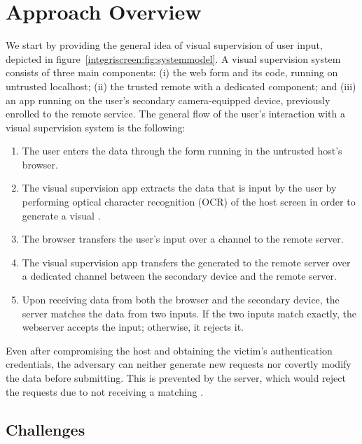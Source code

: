 \section{Approach Overview}
\label{integriscreen:sec:systemDesign}


We start by providing the general idea of visual supervision of user input, depicted in figure~\ref{integriscreen:fig:systemmodel}.
A visual supervision system consists of three main components: (i) the web form and its code, running on untrusted localhost; (ii) the trusted remote \server with a dedicated component; and (iii) an app running on the user's secondary camera-equipped device, previously enrolled to the remote service. The general flow of the user's interaction with a visual supervision system is the following:

\begin{enumerate}
  \item[\one] The user enters the data through the form running in the untrusted host's browser.

  \item[\two] The visual supervision app extracts the data that is input by the user by performing optical character recognition (OCR) of the host screen in order to generate a visual \textit{\POI}.

  \item[\three] The browser transfers the user's input over a \https channel to the remote server.

  \item[\four] The visual supervision app transfers the generated \POI to the remote server over a dedicated \tls channel between the secondary device and the remote server.

  \item[\five] Upon receiving data from both the browser and the secondary device, the server matches the data from two inputs.
  If the two inputs match exactly, the webserver accepts the input; otherwise, it rejects it.
\end{enumerate}


Even after compromising the host and obtaining the victim's authentication credentials, the adversary can neither generate new requests nor covertly modify the data before submitting. This is prevented by the server, which would reject the requests due to not receiving a matching \POI.


\subsection{Challenges}
\label{sec:systemDesign:challenger}

